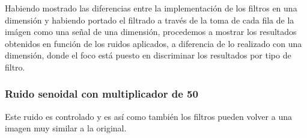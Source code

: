 Habiendo mostrado las diferencias entre la implementaci\'on de los filtros en
una dimensi\'on y habiendo portado el filtrado a trav\'es de la toma de cada
fila de la im\'agen como una se\~nal de una dimensi\'on, procedemos a mostrar
los resultados obtenidos en funci\'on de los ruidos aplicados, a diferencia de
lo realizado con una dimensi\'on, donde el foco est\'a puesto en discriminar los
resultados por tipo de filtro.
\subsubsection{Ruido senoidal con multiplicador de 50}

Este ruido es controlado y es as\'i como tambi\'en los filtros pueden volver a
una imagen muy similar a la original.

\begin{figure}[H]
    \begin{center}


\end{center}
\end{figure}
